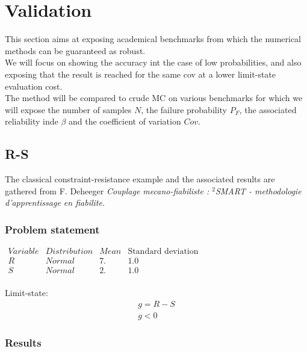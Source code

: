 % 


\section{Validation}

This section aims at exposing academical benchmarks from which the numerical methods can be guaranteed as robust.\\
We will focus on showing the accuracy int the case of low probabilities, and also exposing that the result is reached for the same cov at a lower limit-state evaluation cost.\\
The method will be compared to crude MC on various benchmarks for which we will expose the number of samples $N$, the failure probability $P_F$, the associated reliability inde $\beta$ and the coefficient of variation $Cov$.\\

\subsection{R-S}

The classical constraint-resistance example and the associated results are gathered from F. Deheeger \textit{Couplage mecano-fiabiliste : $^2$SMART - methodologie d'apprentissage en fiabilite}.

\subsubsection{Problem statement}

$
\begin{array}{lrrr}
Variable & Distribution & Mean & \text{Standard deviation} \\
\hline
R & Normal   & 7. & 1.0 \\
S & Normal   & 2. & 1.0 \\
\end{array}
$
\vspace{10mm}


Limit-state:\\
\begin{eqnarray*}
  g = R - S\\
  g < 0
\end{eqnarray*}

\subsubsection{Results}

